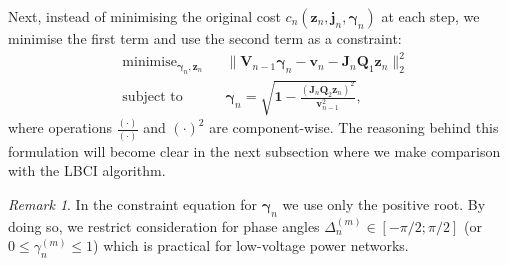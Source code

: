 \documentclass[journal,10pt,onecolumn,draftclsnofoot,]{IEEEtran}
\theoremstyle{plain}
\theoremstyle{definition}
\theoremstyle{remark}
\newtheorem*{remark}{Remark}
\DeclareMathOperator{\minimise}{minimise}
\DeclareMathOperator{\st}{subject ~ to}
\begin{document}
Next, instead of minimising the original cost $c_n(\bm{z}_{n}, \bm{j}_n, \bm{\gamma}_{n})$ at each step, we minimise the first term and use the second term as a constraint:
\begin{equation}
\begin{aligned}
& \minimise_{\bm{\gamma}_{n}, \bm{z}_{n}} 
& & \Big\| \bm{V}_{n-1}\bm{\gamma}_{n} - \bm{v}_{n} - \bm{J}_{n}\bm{Q}_1\bm{z}_{n} \Big\|_2^2 \\
& \st
& & \bm{\gamma}_{n} = \sqrt{\bm{1} - \frac{(\bm{J}_{n}\bm{Q}_2\bm{z}_{n})^2}{\bm{v}^2_{n-1}}},
\end{aligned}
\label{sysid-nlin}
\end{equation}
where operations $\frac{(\cdot)}{(\cdot)}$ and $(\cdot)^2$ are component-wise. The reasoning behind this formulation will become clear in the next subsection where we make comparison with the LBCI algorithm.
\begin{remark}
In the constraint equation for $\bm{\gamma}_{n}$ we use only the positive root. By doing so, we restrict consideration for phase angles $\Delta^{(m)}_{n} \in [-\pi/2; \pi/2]$ (or $0 \le \gamma^{(m)}_{n} \le 1$) which is practical for low-voltage power networks.
\end{remark}
\end{document}
